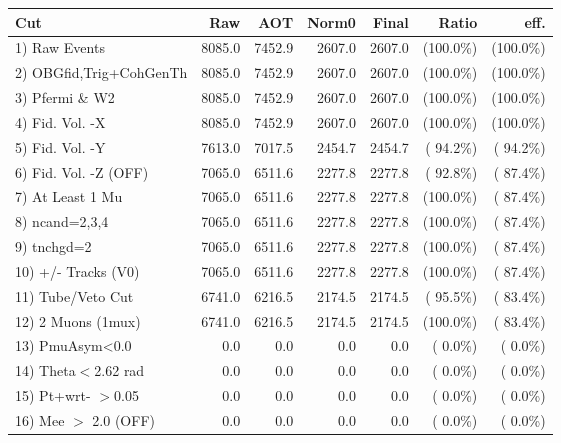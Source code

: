  \begin{table}[h!]\centering
 \begin{tabular}{||l||r|r|r|r|r|r||}
 \hline
 \hline
 Cut & Raw & AOT & Norm0 & Final & Ratio & eff.       \\
 \hline
  1) Raw Events           &       8085.0 &       7452.9 &       2607.0 &       2607.0 & (100.0\%) & (100.0\%) \\
  2) OBGfid,Trig+CohGenTh &       8085.0 &       7452.9 &       2607.0 &       2607.0 & (100.0\%) & (100.0\%) \\
  3) Pfermi \& W2         &       8085.0 &       7452.9 &       2607.0 &       2607.0 & (100.0\%) & (100.0\%) \\
  4) Fid. Vol. -X         &       8085.0 &       7452.9 &       2607.0 &       2607.0 & (100.0\%) & (100.0\%) \\
  5) Fid. Vol. -Y         &       7613.0 &       7017.5 &       2454.7 &       2454.7 & ( 94.2\%) & ( 94.2\%) \\
  6) Fid. Vol. -Z (OFF)   &       7065.0 &       6511.6 &       2277.8 &       2277.8 & ( 92.8\%) & ( 87.4\%) \\
  7) At Least 1 Mu        &       7065.0 &       6511.6 &       2277.8 &       2277.8 & (100.0\%) & ( 87.4\%) \\
  8) ncand=2,3,4          &       7065.0 &       6511.6 &       2277.8 &       2277.8 & (100.0\%) & ( 87.4\%) \\
  9) tnchgd=2             &       7065.0 &       6511.6 &       2277.8 &       2277.8 & (100.0\%) & ( 87.4\%) \\
 10) +/- Tracks (V0)      &       7065.0 &       6511.6 &       2277.8 &       2277.8 & (100.0\%) & ( 87.4\%) \\
 11) Tube/Veto Cut        &       6741.0 &       6216.5 &       2174.5 &       2174.5 & ( 95.5\%) & ( 83.4\%) \\
 12) 2 Muons (1mux)       &       6741.0 &       6216.5 &       2174.5 &       2174.5 & (100.0\%) & ( 83.4\%) \\
 13) PmuAsym<0.0          &          0.0 &          0.0 &          0.0 &          0.0 & (  0.0\%) & (  0.0\%) \\
 14) Theta$<$2.62 rad     &          0.0 &          0.0 &          0.0 &          0.0 & (  0.0\%) & (  0.0\%) \\
 15) Pt+wrt- $>$0.05      &          0.0 &          0.0 &          0.0 &          0.0 & (  0.0\%) & (  0.0\%) \\
 16) Mee $>$ 2.0  (OFF)   &          0.0 &          0.0 &          0.0 &          0.0 & (  0.0\%) & (  0.0\%) \\

\end{tabular}
\end{table}
